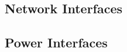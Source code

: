 


\KNEADSUBSECTIONNEWPAGE
\subsection{Network Interfaces}
\label{loc:ExtIF_Network}





\KNEADSUBSECTIONNEWPAGE
\subsection{Power Interfaces}
\label{loc:ExtIF_Power}



